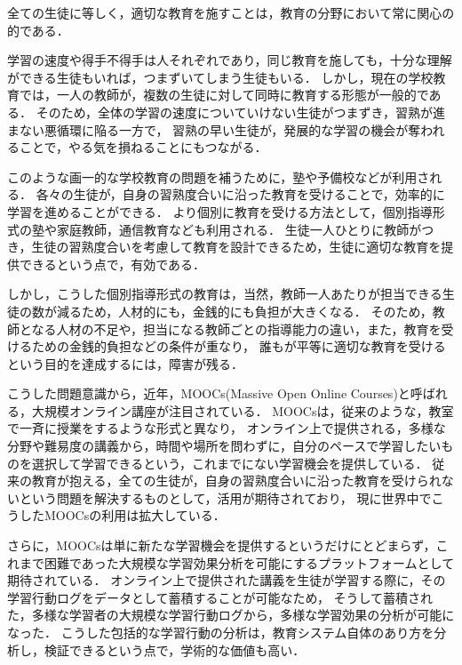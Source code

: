 全ての生徒に等しく，適切な教育を施すことは，教育の分野において常に関心の的である．

学習の速度や得手不得手は人それぞれであり，同じ教育を施しても，十分な理解ができる生徒もいれば，つまずいてしまう生徒もいる．
しかし，現在の学校教育では，一人の教師が，複数の生徒に対して同時に教育する形態が一般的である．
そのため，全体の学習の速度についていけない生徒がつまずき，習熟が進まない悪循環に陥る一方で，
習熟の早い生徒が，発展的な学習の機会が奪われることで，やる気を損ねることにもつながる．


このような画一的な学校教育の問題を補うために，塾や予備校などが利用される．
各々の生徒が，自身の習熟度合いに沿った教育を受けることで，効率的に学習を進めることができる．
より個別に教育を受ける方法として，個別指導形式の塾や家庭教師，通信教育なども利用される．
生徒一人ひとりに教師がつき，生徒の習熟度合いを考慮して教育を設計できるため，生徒に適切な教育を提供できるという点で，有効である．


しかし，こうした個別指導形式の教育は，当然，教師一人あたりが担当できる生徒の数が減るため，人材的にも，金銭的にも負担が大きくなる．
そのため，教師となる人材の不足や，担当になる教師ごとの指導能力の違い，また，教育を受けるための金銭的負担などの条件が重なり，
誰もが平等に適切な教育を受けるという目的を達成するには，障害が残る．


こうした問題意識から，近年，MOOCs(Massive Open Online Courses)と呼ばれる，大規模オンライン講座が注目されている．
MOOCsは，従来のような，教室で一斉に授業をするような形式と異なり，
オンライン上で提供される，多様な分野や難易度の講義から，時間や場所を問わずに，自分のペースで学習したいものを選択して学習できるという，これまでにない学習機会を提供している．
従来の教育が抱える，全ての生徒が，自身の習熟度合いに沿った教育を受けられないという問題を解決するものとして，活用が期待されており，
現に世界中でこうしたMOOCsの利用は拡大している．


さらに，MOOCsは単に新たな学習機会を提供するというだけにとどまらず，これまで困難であった大規模な学習効果分析を可能にするプラットフォームとして期待されている．
オンライン上で提供された講義を生徒が学習する際に，その学習行動ログをデータとして蓄積することが可能なため，
そうして蓄積された，多様な学習者の大規模な学習行動ログから，多様な学習効果の分析が可能になった．
こうした包括的な学習行動の分析は，教育システム自体のあり方を分析し，検証できるという点で，学術的な価値も高い．


